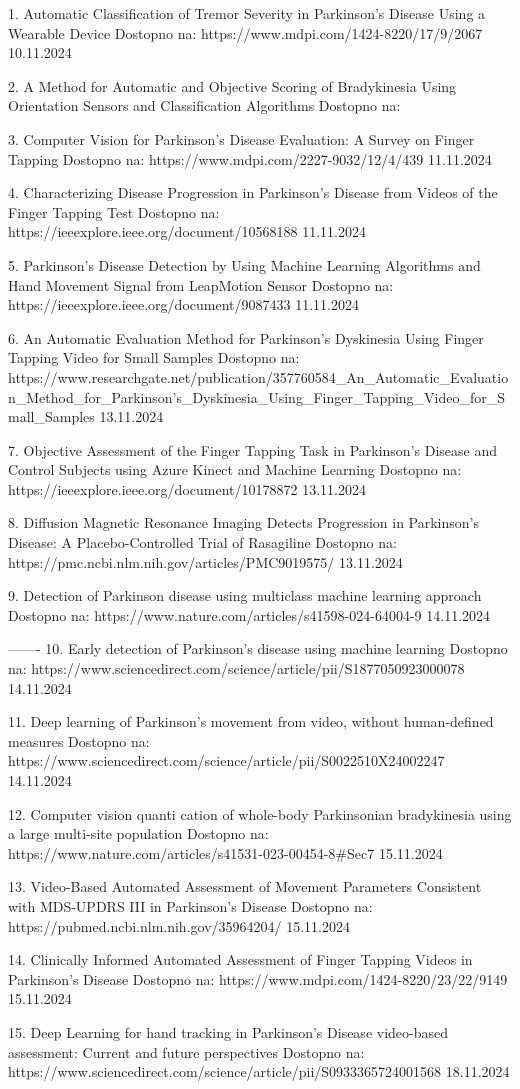 1. Automatic Classification of Tremor Severity in Parkinson’s Disease Using a Wearable Device
Dostopno na: https://www.mdpi.com/1424-8220/17/9/2067
10.11.2024

2. A Method for Automatic and Objective Scoring of Bradykinesia Using Orientation Sensors and Classification Algorithms
Dostopno na: 

3. Computer Vision for Parkinson’s Disease Evaluation: A Survey on Finger Tapping
Dostopno na: https://www.mdpi.com/2227-9032/12/4/439
11.11.2024

4. Characterizing Disease Progression in Parkinson’s Disease from Videos of the Finger Tapping Test
Dostopno na: https://ieeexplore.ieee.org/document/10568188
11.11.2024

5. Parkinson’s Disease Detection by Using Machine Learning Algorithms and Hand Movement Signal from LeapMotion Sensor
Dostopno na: https://ieeexplore.ieee.org/document/9087433
11.11.2024

6. An Automatic Evaluation Method for Parkinson's Dyskinesia Using Finger Tapping Video for Small Samples
Dostopno na: https://www.researchgate.net/publication/357760584_An_Automatic_Evaluation_Method_for_Parkinson's_Dyskinesia_Using_Finger_Tapping_Video_for_Small_Samples 
13.11.2024

7. Objective Assessment of the Finger Tapping Task in Parkinson’s Disease and Control Subjects using Azure Kinect and Machine Learning
Dostopno na: https://ieeexplore.ieee.org/document/10178872
13.11.2024

8. Diffusion Magnetic Resonance Imaging Detects Progression in Parkinson’s Disease: A Placebo-Controlled Trial of Rasagiline
Dostopno na: https://pmc.ncbi.nlm.nih.gov/articles/PMC9019575/
13.11.2024

9. Detection of Parkinson disease using multiclass machine learning approach
Dostopno na: https://www.nature.com/articles/s41598-024-64004-9
14.11.2024

-------
10. Early detection of Parkinson’s disease using machine learning
Dostopno na: https://www.sciencedirect.com/science/article/pii/S1877050923000078
14.11.2024

11. Deep learning of Parkinson's movement from video, without human-defined measures
Dostopno na: https://www.sciencedirect.com/science/article/pii/S0022510X24002247
14.11.2024

12. Computer vision quanti cation of whole-body Parkinsonian bradykinesia using a large multi-site population
Dostopno na: https://www.nature.com/articles/s41531-023-00454-8#Sec7
15.11.2024

13. Video-Based Automated Assessment of Movement Parameters Consistent with MDS-UPDRS III in Parkinson's Disease
Dostopno na: https://pubmed.ncbi.nlm.nih.gov/35964204/
15.11.2024

14. Clinically Informed Automated Assessment of Finger Tapping Videos in Parkinson’s Disease
Dostopno na: https://www.mdpi.com/1424-8220/23/22/9149
15.11.2024

15. Deep Learning for hand tracking in Parkinson’s Disease video-based assessment: Current and future perspectives
Dostopno na: https://www.sciencedirect.com/science/article/pii/S0933365724001568
18.11.2024


